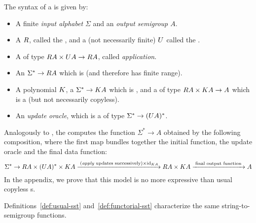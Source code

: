 \begin{definition}\label{def:functorial-sst}
    The syntax of a  is given by:
    \begin{itemize}
        \item A finite \emph{input alphabet} $\Sigma$ and an \emph{output semigroup $A$}.
    \item A  $\functorr$, called the , and a (not necessarily finite)  $\functoru$ called the .
    \item A  of type $\functorr A \times \functoru A \to \functorr A$, called \emph{application}.
    \item An  $\Sigma^* \to \functorr A$ which is  (and therefore has finite range).
    \item A polynomial  $\functork$, a  $\Sigma^* \to \functork A$ which is , and a  of type $\functorr A \times \functork A \to A$ which is a  (but not necessarily copyless).
    \item An \emph{update oracle}, which is a  of type $\Sigma^* \to (\functoru A)^*$.
    \end{itemize}
\end{definition}
Analogously to , the \functorialsst computes the function
$\Sigma^* \to A$ obtained by the following composition, where the first map
bundles together the initial function, the update oracle and the final data
function:
\[ \Sigma^* \to \functorr A \times (\functoru A)^* \times \functork A
  \xrightarrow{\;(\text{\emph{apply} updates successively})\times\mathrm{id}_{\functork A}}
  \functorr A \times \functork A \xrightarrow{\;\text{final output function}\;}
  A \]
In the appendix, we prove that this model is no more expressive than usual copyless \sst{}s.
\begin{lemma}\label{lem:functorial-sst-complete}
    Definitions~\ref{def:usual-sst} and~\ref{def:functorial-sst} characterize the same string-to-semigroup functions.
\end{lemma}
